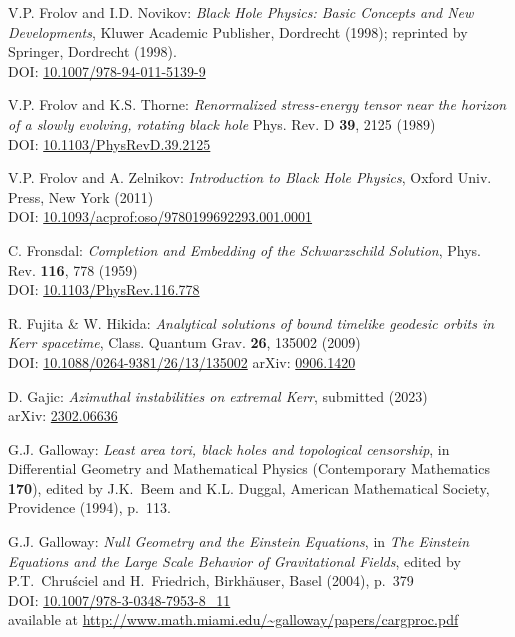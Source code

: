 \begin{thebibliography}{123}
V.P. Frolov and I.D. Novikov:
{\em Black Hole Physics: Basic Concepts and New Developments},
Kluwer Academic Publisher, Dordrecht (1998); reprinted by
Springer, Dordrecht (1998). \\
DOI: \href{https://doi.org/10.1007/978-94-011-5139-9}{10.1007/978-94-011-5139-9}

V.P. Frolov and K.S. Thorne:
{\em Renormalized stress-energy tensor near the horizon of a slowly evolving, rotating black hole}
Phys. Rev. D {\bf 39}, 2125 (1989)\\
DOI: \href{https://doi.org/10.1103/PhysRevD.39.2125}{10.1103/PhysRevD.39.2125}

V.P. Frolov and A. Zelnikov:
{\em Introduction to Black Hole Physics},
Oxford Univ. Press, New York (2011)\\
DOI: \href{https://doi.org/10.1093/acprof:oso/9780199692293.001.0001}{10.1093/acprof:oso/9780199692293.001.0001}

C. Fronsdal: {\em Completion and Embedding of the Schwarzschild Solution},
Phys. Rev. {\bf 116}, 778 (1959) \\
DOI: \href{https://doi.org/10.1103/PhysRev.116.778}{10.1103/PhysRev.116.778}

R. Fujita \& W. Hikida:
{\em Analytical solutions of bound timelike geodesic orbits in Kerr spacetime},
Class. Quantum Grav. {\bf 26}, 135002 (2009) \\
DOI: \href{https://doi.org/10.1088/0264-9381/26/13/135002}{10.1088/0264-9381/26/13/135002}\hfill
arXiv: \href{https://arxiv.org/abs/0906.1420}{0906.1420}

D. Gajic:
{\em Azimuthal instabilities on extremal Kerr},
submitted (2023)\\
arXiv: \href{https://arxiv.org/abs/2302.06636}{2302.06636}

G.J. Galloway:
{\em Least area tori, black holes and topological censorship},
in {\rm Differential Geometry and Mathematical Physics}
(Contemporary Mathematics {\bf 170}),
edited by  J.K.~Beem and K.L. Duggal,
American Mathematical Society, Providence (1994), p.~113.

G.J. Galloway:
{\em Null Geometry and the Einstein Equations},
in {\em The Einstein Equations and the Large Scale Behavior of Gravitational Fields},
edited by P.T.~Chruściel and H.~Friedrich,
Birkhäuser, Basel (2004), p.~379\\
DOI: \href{https://doi.org/10.1007/978-3-0348-7953-8_11}{10.1007/978-3-0348-7953-8\_11}\\
available at
{\small \url{http://www.math.miami.edu/~galloway/papers/cargproc.pdf}}


\end{thebibliography}
